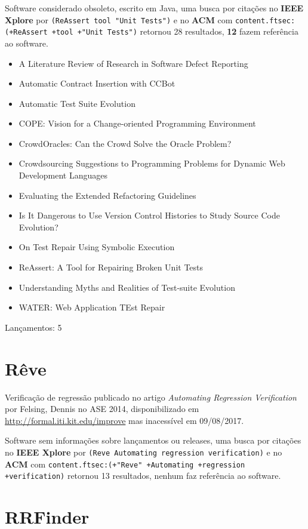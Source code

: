 Software considerado obsoleto,
escrito em Java,
uma busca por citações no {\bf IEEE Xplore} por
\texttt{(ReAssert tool "Unit Tests")}
e no {\bf ACM} com
\texttt{content.ftsec:(+ReAssert +tool +"Unit Tests")}
retornou
28 resultados,
{\bf 12} fazem referência ao software.

\begin{itemize}
\item A Literature Review of Research in Software Defect Reporting
\item Automatic Contract Insertion with CCBot
\item Automatic Test Suite Evolution
\item COPE: Vision for a Change-oriented Programming Environment
\item CrowdOracles: Can the Crowd Solve the Oracle Problem?
\item Crowdsourcing Suggestions to Programming Problems for Dynamic Web Development Languages
\item Evaluating the Extended Refactoring Guidelines
\item Is It Dangerous to Use Version Control Histories to Study Source Code Evolution?
\item On Test Repair Using Symbolic Execution
\item ReAssert: A Tool for Repairing Broken Unit Tests
\item Understanding Myths and Realities of Test-suite Evolution
\item WATER: Web Application TEst Repair
\end{itemize}

Lançamentos: 5

\section{Rêve}

Verificação de regressão
publicado no artigo {\it Automating Regression Verification}
por Felsing, Dennis
no ASE 2014,
disponibilizado em \url{http://formal.iti.kit.edu/improve}
mas inacessível em 09/08/2017.

Software sem informações sobre lançamentos ou releases,
uma busca por citações no {\bf IEEE Xplore} por
\texttt{(Reve Automating regression verification)}
e no {\bf ACM} com
\texttt{content.ftsec:(+"Reve" +Automating +regression +verification)}
retornou
13 resultados,
nenhum faz referência ao software.



\section{RRFinder}

